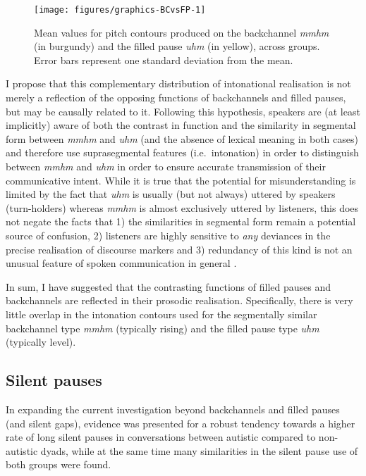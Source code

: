 \begin{figure}

{\texttt{[image: figures/graphics-BCvsFP-1]}
	
}

\caption{Mean values for pitch contours produced on the backchannel \emph{mmhm} (in burgundy) and the filled pause \emph{uhm} (in yellow), across groups. Error bars represent one standard deviation from the mean.}\label{fig:BCvsFP}
\end{figure}

I propose that this complementary distribution of intonational realisation is not merely a reflection of the opposing functions of backchannels and filled pauses, but may be causally related to it. Following this hypothesis, speakers are (at least implicitly) aware of both the contrast in function and the similarity in segmental form between \emph{mmhm} and \emph{uhm} (and the absence of lexical meaning in both cases) and therefore use suprasegmental features (i.e.~intonation) in order to distinguish between \emph{mmhm} and \emph{uhm} in order to ensure accurate transmission of their communicative intent. While it is true that the potential for misunderstanding is limited by the fact that \emph{uhm} is usually (but not always) uttered by speakers (turn-holders) whereas \emph{mmhm} is almost exclusively uttered by listeners, this does not negate the facts that 1) the similarities in segmental form remain a potential source of confusion, 2) listeners are highly sensitive to \emph{any} deviances in the precise realisation of discourse markers and 3) redundancy of this kind is not an unusual feature of spoken communication in general \citep{winterSpokenLanguageAchieves2014a,winterCoevolutionSpeechLexicon2016,corettaMultidimensionalSignalsAnalytic2023,aylettSmoothSignalRedundancy2004}.

In sum, I have suggested that the contrasting functions of filled pauses and backchannels are reflected in their prosodic realisation. Specifically, there is very little overlap in the intonation contours used for the segmentally similar backchannel type \emph{mmhm} (typically rising) and the filled pause type \emph{uhm} (typically level).


\subsection{Silent pauses}\label{BCFP_Discussion_silent}

In expanding the current investigation beyond backchannels and filled pauses (and silent gaps), evidence was presented for a robust tendency towards a higher rate of long silent pauses in conversations between autistic compared to non-autistic dyads, while at the same time many similarities in the silent pause use of both groups were found.


